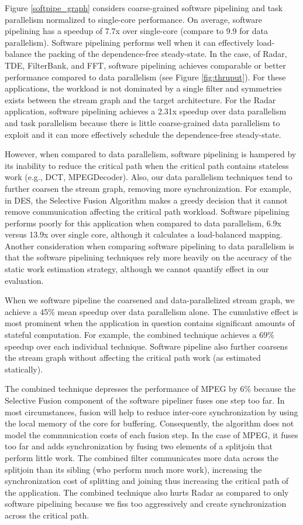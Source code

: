 Figure \ref{softpipe_graph} considers coarse-grained software
pipelining and task parallelism normalized to single-core performance.
On average, software pipelining has a speedup of 7.7x over single-core
(compare to 9.9 for data parallelism). Software pipelining performs
well when it can effectively load-balance the packing of the
dependence-free steady-state.  In the case, of Radar, TDE, FilterBank,
and FFT, software pipelining achieves comparable or better performance
compared to data parallelism (see Figure \ref{fig:thruput}).  For
these applications, the workload is not dominated by a single filter
and symmetries exists between the stream graph and the target
architecture.  For the Radar application, software pipelining achieves
a 2.31x speedup over data parallelism and task parallelism because
there is little coarse-grained data parallelism to exploit and it can
more effectively schedule the dependence-free steady-state.

However, when compared to data parallelism, software pipelining is
hampered by its inability to reduce the critical path when the
critical path contains stateless work (e.g., DCT, MPEGDecoder).  Also,
our data parallelism techniques tend to further coarsen the stream
graph, removing more synchronization.  For example, in DES, the
Selective Fusion Algorithm makes a greedy decision that it cannot
remove communication affecting the critical path workload.  Software
pipelining performs poorly for this application when compared to data
parallelism, 6.9x versus 13.9x over single core, although it
calculates a load-balanced mapping.  Another consideration when
comparing software pipelining to data parallelism is that the software
pipelining techniques rely more heavily on the accuracy of the static
work estimation strategy, although we cannot quantify effect in our
evaluation. 

When we software pipeline the coarsened and data-parallelized stream
graph, we achieve a 45\% mean speedup over data parallelism alone. The
cumulative effect is most prominent when the application in question
contains significant amounts of stateful computation.  For example,
the combined technique achieves a 69\% speedup over each individual
technique. Software pipeline also further coarsens the stream graph
without affecting the critical path work (as estimated statically).

The combined technique depresses the performance of MPEG by 6\%
because the Selective Fusion component of the software pipeliner fuses
one step too far.  In most circumstances, fusion will help to reduce
inter-core synchronization by using the local memory of the core for
buffering. Consequently, the algorithm does not model the
communication costs of each fusion step. In the case of MPEG, it fuses
too far and adds synchronization by fusing two elements of a splitjoin
that perform little work.  The combined filter communicates more data
across the splitjoin than its sibling (who perform much more work),
increasing the synchronization cost of splitting and joining thus
increasing the critical path of the application.  The combined
technique also hurts Radar as compared to only software pipelining
because we fiss too aggressively and create synchronization across the
critical path.

